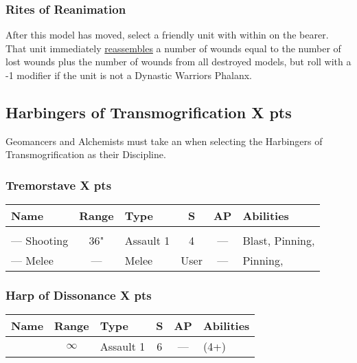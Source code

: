 \subsubsection{Rites of Reanimation} \label{Rites of Reanimation}

After this model has moved, select a friendly unit with  within  on the bearer. That unit immediately \textcolor{violet}{\hyperref[Reanimation Protocols]{reassembles}} a number of wounds equal to the number of lost wounds plus the number of wounds from all destroyed models, but roll with a -1 modifier if the unit is not a Dynastic Warriors Phalanx.



\subsection[Harbingers of Transmogrification ]{Harbingers of Transmogrification  \hrulefill X pts}

Geomancers and Alchemists must take an  when selecting the Harbingers of Transmogrification as their Discipline.

\subsubsection[Tremorstave]{Tremorstave \hrulefill X pts}
\label{Tremorstave}
\noindent
\begin{NiceTabular}{L{115 pt} c C{40pt} *{2}{c} >{\raggedright\arraybackslash}p{240pt}}
	Name & Range & Type & S & AP & Abilities \\
	\hline
	 &  &  &  &  & \\
	— Shooting & 36" & Assault 1 & 4 & — & Blast, Pinning,   \\
	— Melee & — & Melee & User & — & Pinning,  \\
\end{NiceTabular}

\subsubsection[Harp of Dissonance ]{Harp of Dissonance  \hrulefill X pts}

\label{Harp of Dissonance}
\noindent
\begin{NiceTabular}{L{115 pt} c C{40pt} *{2}{c} >{\raggedright\arraybackslash}p{240pt}}
	Name & Range & Type & S & AP & Abilities \\
	\hline
	 & $\infty$ & Assault 1 & 6 & — &  (4+) \\
\end{NiceTabular}

